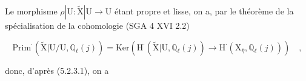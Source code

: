 %
%
%
%
%
Le morphisme $\rho|\mathrm{U} : \widetilde{\mathrm{X}}|\mathrm{U} \longrightarrow \mathrm{U}$ étant propre et lisse, on a, par le théorème de la spécialisation de la cohomologie (SGA 4 XVI 2.2)

\begin{equation}\tag{5.8.2.2}
\mathrm{Prim}^{\cdot}(\widetilde{\mathrm{X}}|\mathrm{U}/\mathrm{U},\mathbb{Q}_\ell(j)) = \mathrm{Ker}(\mathrm{H}^{\cdot}(\widetilde{\mathrm{X}}|\mathrm{U},\mathbb{Q}_\ell(j)) \longrightarrow \mathrm{H}^{\cdot}(\mathrm{X}_{\overline{\eta}},\mathbb{Q}_\ell(j))) \quad ,
\end{equation}

donc, d'après (5.2.3.1), on a

